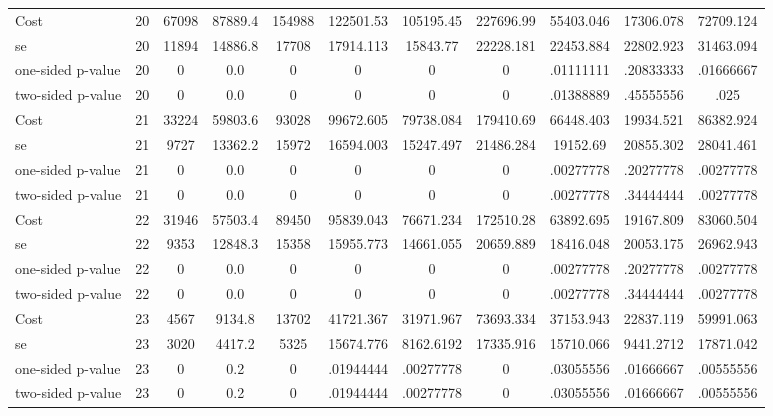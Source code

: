 \begin{tabular}{lcccccccccc}
Cost 			  &        20 &     67098 &   87889.4 &    154988 & 122501.53 & 105195.45 & 227696.99 & 55403.046 & 17306.078 & 72709.124 \\  
se 				  &        20 &     11894 &   14886.8 &     17708 & 17914.113 & 15843.77 & 22228.181 & 22453.884 & 22802.923 & 31463.094 \\  
one-sided p-value &        20 &         0 &       0.0 &         0 & 0 & 0 & 0 & .01111111 & .20833333 & .01666667 \\  
two-sided p-value &        20 &         0 &       0.0 &         0 & 0 & 0 & 0 & .01388889 & .45555556 & .025 \\  
Cost 			  &        21 &     33224 &   59803.6 &     93028 & 99672.605 & 79738.084 & 179410.69 & 66448.403 & 19934.521 & 86382.924 \\  
se 				 &        21 &      9727 &   13362.2 &     15972 & 16594.003 & 15247.497 & 21486.284 & 19152.69 & 20855.302 & 28041.461 \\  
one-sided p-value&        21 &         0 &       0.0 &         0 & 0 & 0 & 0 & .00277778 & .20277778 & .00277778 \\  
two-sided p-value&        21 &         0 &       0.0 &         0 & 0 & 0 & 0 & .00277778 & .34444444 & .00277778 \\  
Cost 			  &        22 &     31946 &   57503.4 &     89450 & 95839.043 & 76671.234 & 172510.28 & 63892.695 & 19167.809 & 83060.504 \\  
se 				 &        22 &      9353 &   12848.3 &     15358 & 15955.773 & 14661.055 & 20659.889 & 18416.048 & 20053.175 & 26962.943 \\  
one-sided p-value&        22 &         0 &       0.0 &         0 & 0 & 0 & 0 & .00277778 & .20277778 & .00277778 \\  
two-sided p-value&        22 &         0 &       0.0 &         0 & 0 & 0 & 0 & .00277778 & .34444444 & .00277778 \\  
Cost 			  &        23 &      4567 &    9134.8 &     13702 & 41721.367 & 31971.967 & 73693.334 & 37153.943 & 22837.119 & 59991.063 \\  
se 				 &        23 &      3020 &    4417.2 &      5325 & 15674.776 & 8162.6192 & 17335.916 & 15710.066 & 9441.2712 & 17871.042 \\  
one-sided p-value&        23 &         0 &       0.2 &         0 & .01944444 & .00277778 & 0 & .03055556 & .01666667 & .00555556 \\  
two-sided p-value&        23 &         0 &       0.2 &         0 & .01944444 & .00277778 & 0 & .03055556 & .01666667 & .00555556 \\  

\end{tabular}
